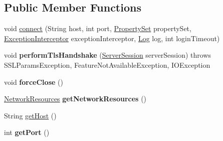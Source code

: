 \subsection*{Public Member Functions}
\begin{DoxyCompactItemize}
\item 
void \mbox{\hyperlink{interfacecom_1_1mysql_1_1cj_1_1protocol_1_1_socket_connection_ac20aea608e999684c82a0dbaaa5886c7}{connect}} (String host, int port, \mbox{\hyperlink{interfacecom_1_1mysql_1_1cj_1_1conf_1_1_property_set}{Property\+Set}} property\+Set, \mbox{\hyperlink{interfacecom_1_1mysql_1_1cj_1_1exceptions_1_1_exception_interceptor}{Exception\+Interceptor}} exception\+Interceptor, \mbox{\hyperlink{interfacecom_1_1mysql_1_1cj_1_1log_1_1_log}{Log}} log, int login\+Timeout)
\item 
\mbox{\label{interfacecom_1_1mysql_1_1cj_1_1protocol_1_1_socket_connection_a15064c0de5e729be5f27a42aee58fdd5}} 
void {\bfseries perform\+Tls\+Handshake} (\mbox{\hyperlink{interfacecom_1_1mysql_1_1cj_1_1protocol_1_1_server_session}{Server\+Session}} server\+Session)  throws S\+S\+L\+Params\+Exception, Feature\+Not\+Available\+Exception, I\+O\+Exception
\item 
\mbox{\label{interfacecom_1_1mysql_1_1cj_1_1protocol_1_1_socket_connection_abca5f1289b335c1f44ac09ee1052a179}} 
void {\bfseries force\+Close} ()
\item 
\mbox{\label{interfacecom_1_1mysql_1_1cj_1_1protocol_1_1_socket_connection_aaf05ea68f2fb6c8c192ee8ec8f8faf91}} 
\mbox{\hyperlink{classcom_1_1mysql_1_1cj_1_1protocol_1_1_network_resources}{Network\+Resources}} {\bfseries get\+Network\+Resources} ()
\item 
String \mbox{\hyperlink{interfacecom_1_1mysql_1_1cj_1_1protocol_1_1_socket_connection_a1fa2cc5cddf0b92a9f19472924aa6e61}{get\+Host}} ()
\item 
\mbox{\label{interfacecom_1_1mysql_1_1cj_1_1protocol_1_1_socket_connection_afb84b242933a9707222f246fd64dffb1}} 
int {\bfseries get\+Port} ()
\item 
\mbox{\label{interfacecom_1_1mysql_1_1cj_1_1protocol_1_1_socket_connection_a121c70b73c6aed15d44533af8194ba8c}} 

\end{DoxyCompactItemize}
